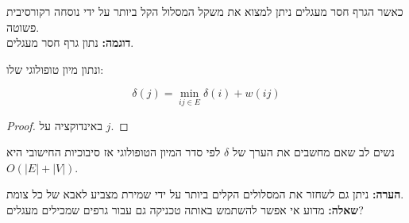 כאשר הגרף חסר מעגלים ניתן למצוא את משקל המסלול הקל ביותר על ידי נוסחה רקורסיבית פשוטה.
\\
\textbf{דוגמה:}
נתון גרף חסר מעגלים.

\begin{center}
\end{center}

ונתון מיון טופולוגי שלו:
\begin{center}
\end{center}

\begin{claim}
$$
\delta(j) = \min_{ij \in E} \delta(i) + w(ij)
$$
\end{claim}

\begin{proof}
באינדוקציה על $j$.
\end{proof}

נשים לב שאם מחשבים את הערך של 
$\delta$
לפי סדר המיון הטופולוגי אז סיבוכיות החישובי היא 
$O(|E| + |V|)$.

\textbf{הערה:}
ניתן גם לשחזר את המסלולים הקלים ביותר על ידי שמירת מצביע לאבא של כל צומת.
\\
\textbf{שאלה:}
מדוע אי אפשר להשתמש באותה טכניקה גם עבור גרפים שמכילים מעגלים?
